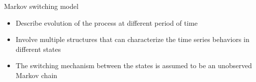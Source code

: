 \documentclass{beamer}
\begin{document}
\begin{frame}[fragile]
Markov switching model \cite{p1}

\begin{itemize}
	\item Describe evolution of the process at different period of time
	\item Involve multiple structures that can characterize the time series behaviors in different states
	\item The switching mechanism between the states is assumed to be an unobserved Markov chain
\end{itemize}

\end{frame}
\end{document}
